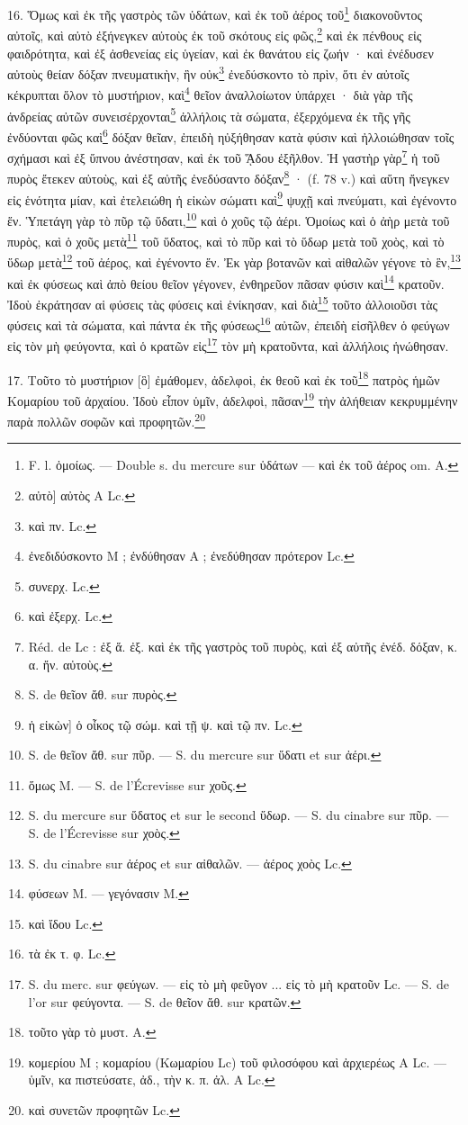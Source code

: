 \documentclass[a4paper, 11pt, oneside, polutonikogreek, french]{article}
\begin{document}
16. Ὅμως καὶ ἐκ τῆς γαστρὸς τῶν ὑδάτων, καὶ ἐκ τοῦ ἀέρος τοῦ\footnote{F. l. ὁμοίως. --- Double s. du mercure sur ὑδάτων --- καὶ ἐκ τοῦ ἀέρος om. A.} διακονοῦντος αὐτοῖς, καὶ αὐτὸ ἐξήνεγκεν αὐτοὺς ἐκ τοῦ σκότους εἰς φῶς,\footnote{αὐτὸ] αὐτὸς A Lc.} καὶ ἐκ πένθους εἰς φαιδρότητα, καὶ ἐξ ἀσθενείας εἰς ὑγείαν, καὶ ἐκ θανάτου εἰς ζωήν · καὶ ἐνέδυσεν αὐτοὺς θείαν δόξαν πνευματικὴν, ἣν οὐκ\footnote{καὶ πν. Lc.} ἐνεδύσκοντο τὸ πρὶν, ὅτι ἐν αὐτοῖς κέκρυπται ὅλον τὸ μυστήριον, καὶ\footnote{ἐνεδιδύσκοντο M ; ἐνδύθησαν A ; ἐνεδύθησαν πρότερον Lc.} θεῖον ἀναλλοίωτον ὑπάρχει · διὰ γὰρ τῆς ἀνδρείας αὐτῶν συνεισέρχονται\footnote{συνερχ. Lc.} ἀλλήλοις τὰ σώματα, ἐξερχόμενα ἐκ τῆς γῆς ἐνδύονται φῶς καὶ\footnote{καὶ ἐξερχ. Lc.} δόξαν θεῖαν, ἐπειδὴ ηὐξήθησαν κατὰ φύσιν καὶ ἠλλοιώθησαν τοῖς σχήμασι καὶ ἐξ ὕπνου ἀνέστησαν, καὶ ἐκ τοῦ ᾍδου ἐξῆλθον. Ἡ γαστὴρ γὰρ\footnote{Réd. de Lc : ἐξ ἅ. ἐξ. καὶ ἐκ τῆς γαστρὸς τοῦ πυρὸς, καὶ ἐξ αὐτῆς ἐνέδ. δόξαν, κ. α. ἤν. αὐτοὺς.} ἡ τοῦ πυρὸς ἔτεκεν αὐτοὺς, καὶ ἐξ αὐτῆς ἐνεδύσαντο δόξαν\footnote{S. de θεῖον ἄθ. sur πυρὸς.} · (f. 78 v.) καὶ αὕτη ἤνεγκεν εἰς ἑνότητα μίαν, καὶ ἐτελειώθη ἡ εἰκὼν σώματι καὶ\footnote{ἡ εἰκὼν] ὁ οἶκος τῷ σώμ. καὶ τῇ ψ. καὶ τῷ πν. Lc.} ψυχῇ καὶ πνεύματι, καὶ ἐγένοντο ἕν. Ὑπετάγη γὰρ τὸ πῦρ τῷ ὕδατι,\footnote{S. de θεῖον ἄθ. sur πῦρ. --- S. du mercure sur ὕδατι et sur ἀέρι.} καὶ ὁ χοῦς τῷ ἀέρι. Ὁμοίως καὶ ὁ ἀὴρ μετὰ τοῦ πυρὸς, καὶ ὁ χοῦς μετὰ\footnote{ὅμως M. --- S. de l'Écrevisse sur χοῦς.} τοῦ ὕδατος, καὶ τὸ πῦρ καὶ τὸ ὕδωρ μετὰ τοῦ χοὸς, καὶ τὸ ὕδωρ μετὰ\footnote{S. du mercure sur ὕδατος et sur le second ὕδωρ. --- S. du cinabre sur πῦρ. --- S. de l'Écrevisse sur χοὸς.} τοῦ ἀέρος, καὶ ἐγένοντο ἕν. Ἐκ γὰρ βοτανῶν καὶ αἰθαλῶν γέγονε τὸ ἓν,\footnote{S. du cinabre sur ἀέρος et sur αἰθαλῶν. --- ἀέρος χοὸς Lc.} καὶ ἐκ φύσεως καὶ ἀπὸ θείου θεῖον γέγονεν, ἐνθηρεῦον πᾶσαν φύσιν καὶ\footnote{φύσεων M. --- γεγόνασιν M.} κρατοῦν. Ἰδοὺ ἐκράτησαν αἱ φύσεις τὰς φύσεις καὶ ἐνίκησαν, καὶ διὰ\footnote{καὶ ἴδου Lc.} τοῦτο ἀλλοιοῦσι τὰς φύσεις καὶ τὰ σώματα, καὶ πάντα ἐκ τῆς φύσεως\footnote{τὰ ἐκ τ. φ. Lc.} αὐτῶν, ἐπειδὴ εἰσῆλθεν ὁ φεύγων εἰς τὸν μὴ φεύγοντα, καὶ ὁ κρατῶν εἰς\footnote{S. du merc. sur φεύγων. --- εἰς τὸ μὴ φεῦγον ... εἰς τὸ μὴ κρατοῦν Lc. --- S. de l'or sur φεύγοντα. --- S. de θεῖον ἄθ. sur κρατῶν.} τὸν μὴ κρατοῦντα, καὶ ἀλλήλοις ἡνώθησαν.

17. Τοῦτο τὸ μυστήριον [ὃ] ἐμάθομεν, ἀδελφοὶ, ἐκ θεοῦ καὶ ἐκ τοῦ\footnote{τοῦτο γὰρ τὸ μυστ. A.} πατρὸς ἡμῶν Κομαρίου τοῦ ἀρχαίου. Ἰδοὺ εἶπον ὑμῖν, ἀδελφοὶ, πᾶσαν\footnote{κομερίου M ; κομαρίου (Κωμαρίου Lc) τοῦ φιλοσόφου καὶ ἀρχιερέως A Lc. --- ὑμῖν, κα πιστεύσατε, ἀδ., τὴν κ. π. ἀλ. A Lc.} τὴν ἀλήθειαν κεκρυμμένην παρὰ πολλῶν σοφῶν καὶ προφητῶν.\footnote{καὶ συνετῶν προφητῶν Lc.}
\end{document}
